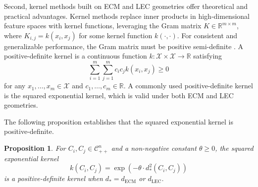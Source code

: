 \documentclass[10pt]{article}
\newtheorem{proposition}[theorem]{Proposition}
\newcommand{\CORR}{\mathcal{C}_{++}^n}
\newcommand{\rmECM}{\textrm{ECM}}
\newcommand{\rmLEC}{\textrm{LEC}}
\begin{document}
Second, kernel methods built on ECM and LEC geometries offer theoretical and practical advantages. Kernel methods replace inner products in high-dimensional feature spaces with kernel functions, leveraging the Gram matrix $K \in \mathbb{R}^{m \times m}$, where $K_{i,j} = k(x_i, x_j)$ for some kernel function $k(\cdot, \cdot)$. For consistent and generalizable performance, the Gram matrix must be positive semi-definite \citep{mohri_2012_FoundationsMachineLearning}. A positive-definite kernel is a continuous function $k: \mathcal{X} \times \mathcal{X} \rightarrow \mathbb{R}$ satisfying 
\begin{equation*}
	\sum_{i=1}^m \sum_{j=1}^m c_i c_j k(x_i, x_j) \geq 0
\end{equation*}
for any $x_1, \ldots, x_m \in \mathcal{X}$ and $c_1, \ldots, c_m \in \mathbb{R}$. A commonly used positive-definite kernel is the squared exponential kernel, which is valid under both ECM and LEC geometries.

The following proposition establishes that the squared exponential kernel is positive-definite.

\begin{proposition}\label{thm:pdkernel}
	For $C_i, C_j \in \CORR$ and a non-negative constant $\theta \geq 0$, the squared exponential kernel 
	\begin{equation}\label{eq:pdkernel}
		k(C_i, C_j) = \exp \left(- \theta \cdot  {d_*^2(C_i,C_j)}\right)
	\end{equation}
	is a positive-definite kernel when $d_* = d_{\rmECM}$ or $d_{\rmLEC}$.
\end{proposition}
\end{document}
